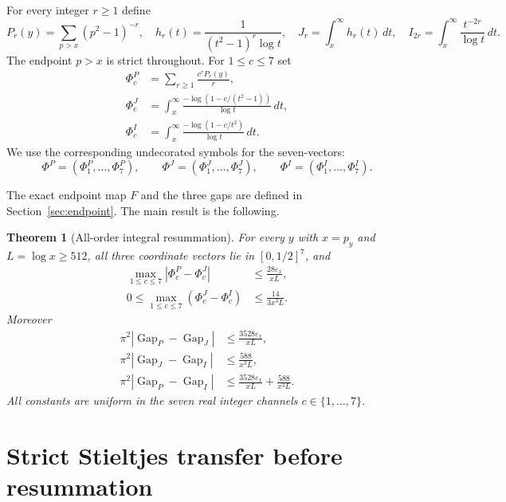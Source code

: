 \documentclass[11pt]{article}
\newtheorem{theorem}{Theorem}[section]
\theoremstyle{definition}
\theoremstyle{remark}
\newcommand{\eps}{\varepsilon}
\newcommand{\PhiP}{\Phi^{P}}
\newcommand{\PhiJ}{\Phi^{J}}
\newcommand{\PhiI}{\Phi^{I}}
\newcommand{\GapP}{\operatorname{Gap}_{P}}
\newcommand{\GapJ}{\operatorname{Gap}_{J}}
\newcommand{\GapI}{\operatorname{Gap}_{I}}
\begin{document}
For every integer $r\ge1$ define
\begin{equation}
 P_r(y)=\sum_{p>x}(p^2-1)^{-r},\quad
 h_r(t)=\frac{1}{(t^2-1)^r\log t},\quad
 J_r=\int_x^\infty h_r(t)\,dt,\quad
 I_{2r}=\int_x^\infty \frac{t^{-2r}}{\log t}\,dt.
 \label{eq:tails}
\end{equation}
The endpoint $p>x$ is strict throughout.  For $1\le c\le7$ set
\begin{align}
 \PhiP_c&=\sum_{r\ge1}\frac{c^rP_r(y)}{ r},\label{eq:PhiP}\tag{P}\\
 \PhiJ_c&=\int_x^\infty\frac{-\log(1-c/(t^2-1))}{\log t}\,dt,
 \label{eq:PhiJ}\tag{J}\\
 \PhiI_c&=\int_x^\infty\frac{-\log(1-c/t^2)}{\log t}\,dt.
 \label{eq:PhiI}\tag{I}
\end{align}
We use the corresponding undecorated symbols for the seven-vectors:
\begin{equation}
 \PhiP=(\PhiP_1,\ldots,\PhiP_7),\qquad
 \PhiJ=(\PhiJ_1,\ldots,\PhiJ_7),\qquad
 \PhiI=(\PhiI_1,\ldots,\PhiI_7).
 \label{eq:coordinate-vectors}
\end{equation}

The exact endpoint map $F$ and the three gaps are defined in
Section~\ref{sec:endpoint}.  The main result is the following.

\begin{theorem}[All-order integral resummation]
\label{thm:main}
For every $y$ with $x=p_y$ and $L=\log x\ge512$, all three coordinate
vectors lie in $[0,1/2]^7$, and
\begin{align}
 \max_{1\le c\le7}|\PhiP_c-\PhiJ_c|
 &\le \frac{28\eps_x}{ xL},\label{eq:coordinate-source}\\
 0\le\max_{1\le c\le7}(\PhiJ_c-\PhiI_c)
 &\le \frac{14}{3x^3L}.\label{eq:coordinate-power}
\end{align}
Moreover
\begin{align}
 \pi^2|\GapP-\GapJ|&\le \frac{3528\eps_x}{ xL},
 \label{eq:gap-source}\\
 \pi^2|\GapJ-\GapI|&\le \frac{588}{ x^3L},
 \label{eq:gap-power}\\
 \pi^2|\GapP-\GapI|&\le \frac{3528\eps_x}{ xL}+\frac{588}{ x^3L}.
 \label{eq:gap-combined}
\end{align}
All constants are uniform in the seven real integer channels
$c\in\{1,\ldots,7\}$.
\end{theorem}

\section{Strict Stieltjes transfer before resummation}
\end{document}

